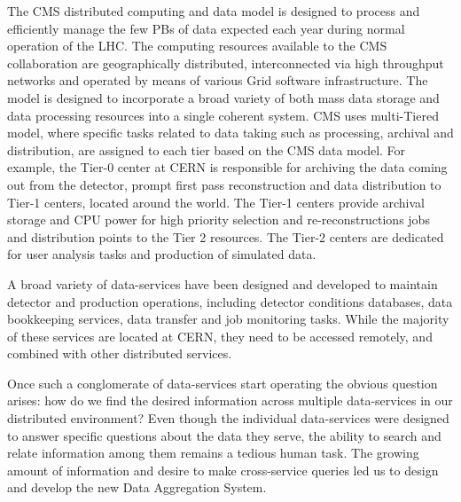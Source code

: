 \documentclass[1p,times]{elsarticle}
\begin{document}
The CMS distributed computing and data model \cite{CMSDataModel} 
is designed to process and efficiently manage the few PBs of data expected each year
during normal operation of the LHC. The computing resources available to the CMS
collaboration are geographically distributed, 
interconnected via high throughput networks and operated by means 
of various Grid software infrastructure. The model is designed to
incorporate a broad variety of both mass data storage and data processing
resources into a single coherent system. CMS uses
multi-Tiered model, where specific tasks related to data taking such as
processing, archival and distribution, are assigned to each tier based
on the CMS data model. For example, the Tier-0 center at CERN is responsible
for archiving the data coming out from the detector, prompt first pass reconstruction
and data distribution to Tier-1 centers, located around the world.
The Tier-1 centers provide archival storage and CPU power for high
priority selection and re-reconstructions jobs and distribution points
to the Tier 2 resources.
The Tier-2 centers are dedicated for user analysis tasks and production of simulated data.

A broad variety of data-services have been designed and developed to
maintain detector and production operations, including detector
conditions databases, data bookkeeping services,
data transfer and job monitoring tasks. While the majority of these
services are located at CERN, they need to be accessed remotely, and
combined with other distributed services.

Once such a conglomerate of data-services start operating the obvious
question arises: how do we find the desired information across multiple data-services
in our distributed environment? Even though the individual data-services were designed
to answer specific questions about the data they serve, the ability to search and relate
information among them remains a tedious human task. The growing amount of information
and desire to make cross-service queries led us to design and develop the new
Data Aggregation System.
\end{document}
